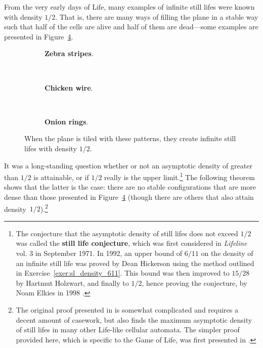 From the very early days of Life, many examples of infinite still lifes were known with density $1/2$. That is, there are many ways of filling the plane in a stable way such that half of the cells are alive and half of them are dead---some examples are presented in Figure~\ref{fig:dense_still_lifes}.
\begin{figure}[!ht]
	\begin{subfigure}{.32\textwidth}
		\centering
		\caption{\textbf{Zebra stripes}.}
		\label{fig:zebra_stripes}
	\end{subfigure} \ \ %
	\begin{subfigure}{.32\textwidth}
		\centering
		\caption{\textbf{Chicken wire}.}
		\label{fig:chicken_wire}
	\end{subfigure} \ \ %
	\begin{subfigure}{.32\textwidth}
		\centering
		\caption{\textbf{Onion rings}.}
		\label{fig:onion_rings}
	\end{subfigure}
	\caption{When the plane is tiled with these patterns, they create infinite still lifes with density $1/2$.}\label{fig:dense_still_lifes}
\end{figure}

It was a long-standing question whether or not an asymptotic density of greater than $1/2$ is attainable, or if $1/2$ really is the upper limit.\footnote{The conjecture that the asymptotic density of still lifes does not exceed $1/2$ was called the \textbf{still life conjecture}, which was first considered in \emph{Lifeline} vol. 3 in September 1971. In 1992, an upper bound of $6/11$ on the density of an infinite still life was proved by Dean Hickerson using the method outlined in Exercise~\ref{exer:sl_density_611}. This bound was then improved to $15/28$ by Hartmut Holzwart, and finally to $1/2$, hence proving the conjecture, by Noam Elkies in 1998 \cite{Elk98}.} The following theorem shows that the latter is the case: there are no stable configurations that are more dense than those presented in Figure~\ref{fig:dense_still_lifes} (though there are others that also attain density~$1/2$).\footnote{The original proof presented in \cite{Elk98} is somewhat complicated and requires a decent amount of casework, but also finds the maximum asymptotic density of still lifes in many other Life-like cellular automata. The simpler proof provided here, which is specific to the Game of Life, was first presented in \cite{CSB09}.}

